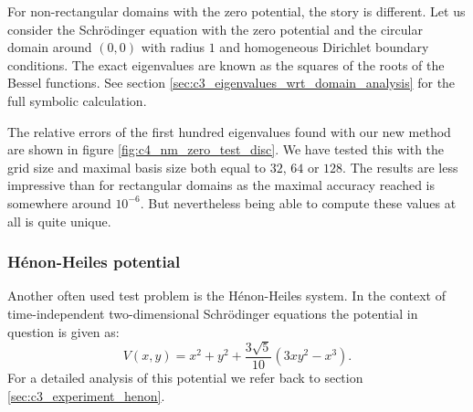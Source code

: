 For non-rectangular domains with the zero potential, the story is different. Let us consider the Schrödinger equation with the zero potential and the circular domain around $(0, 0)$ with radius $1$ and homogeneous Dirichlet boundary conditions. The exact eigenvalues are known as the squares of the roots of the Bessel functions. See section \ref{sec:c3_eigenvalues_wrt_domain_analysis} for the full symbolic calculation.

The relative errors of the first hundred eigenvalues found with our new method are shown in figure \ref{fig:c4_nm_zero_test_disc}. We have tested this with the grid size and maximal basis size both equal to $32$, $64$ or $128$. The results are less impressive than for rectangular domains as the maximal accuracy reached is somewhere around $10^{-6}$. But nevertheless being able to compute these values at all is quite unique.


\subsubsection{Hénon-Heiles potential}\label{sec:c4_numerical_henon_heiles}

Another often used test problem is the Hénon-Heiles system. In the context of time-independent two-dimensional Schrödinger equations the potential in question is given as:
$$
V(x, y) = x^2 + y^2 + \frac{3\sqrt{5}}{10}(3 x y^2 - x^3)\text{.}
$$
For a detailed analysis of this potential we refer back to section \ref{sec:c3_experiment_henon}.

